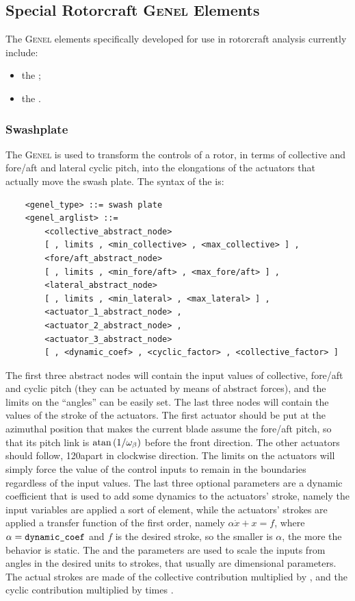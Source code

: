 \subsection{Special Rotorcraft \textsc{Genel} Elements}
The \textsc{Genel} elements specifically developed for use
in rotorcraft analysis currently include:
\begin{itemize}
\item the ;
\item the .
\end{itemize}

\subsubsection{Swashplate}
The  \textsc{Genel} is used to transform the controls 
of a rotor, in terms of collective and fore/aft and lateral cyclic pitch, 
into the elongations of the actuators that actually move the swash plate.
The syntax of the  is:
\begin{verbatim}
    <genel_type> ::= swash plate
    <genel_arglist> ::=
        <collective_abstract_node> 
        [ , limits , <min_collective> , <max_collective> ] ,
        <fore/aft_abstract_node> 
        [ , limits , <min_fore/aft> , <max_fore/aft> ] ,
        <lateral_abstract_node> 
        [ , limits , <min_lateral> , <max_lateral> ] ,
        <actuator_1_abstract_node> ,
        <actuator_2_abstract_node> ,
        <actuator_3_abstract_node> 
        [ , <dynamic_coef> , <cyclic_factor> , <collective_factor> ]
\end{verbatim}
The first three abstract nodes will contain the input values 
of collective, fore/aft and cyclic pitch
(they can be actuated by means of abstract forces),
and the limits on the ``angles'' can be easily set. 
The last three nodes will contain the values of the stroke of the actuators.
The first actuator should be put at the azimuthal position 
that makes the current blade assume the fore/aft pitch,
so that its pitch link is $\mathrm{atan}\left( 1/\omega_{\beta} \right)$
before the front direction.
The other actuators should follow, 120\degr apart in clockwise direction.
The limits on the actuators will simply force the value of the control
inputs to remain in the boundaries regardless of the input values.
The last three optional parameters are a dynamic coefficient that is used to
add some dynamics to the actuators' stroke, namely the input variables are
applied a sort of   element, while the
actuators' strokes are applied a transfer function of the first order, namely
$ \alpha\dot{x}+x=f $, where $ \alpha=\texttt{dynamic\_coef} $ and $ f $ is
the desired stroke, so the smaller is $ \alpha $, the more the behavior is
static.
The  and the  parameters are
used to scale the inputs from angles in the desired units to strokes, that
usually are dimensional parameters. The actual strokes are made of the
collective contribution multiplied by , and the
cyclic contribution multiplied by  times 
.

